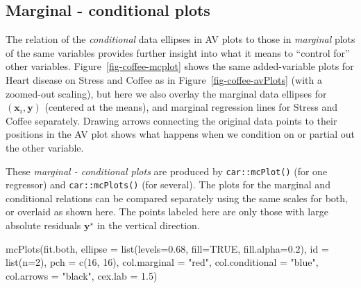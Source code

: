 \documentclass[
  letterpaper,
  10pt,
  krantz2]{krantz}
\makeatletter
\newenvironment{Shaded}{\begin{snugshade}}{\end{snugshade}}
\newcommand{\AttributeTok}[1]{\textcolor[rgb]{0.40,0.45,0.13}{#1}}
\newcommand{\ConstantTok}[1]{\textcolor[rgb]{0.56,0.35,0.01}{#1}}
\newcommand{\DecValTok}[1]{\textcolor[rgb]{0.68,0.00,0.00}{#1}}
\newcommand{\FloatTok}[1]{\textcolor[rgb]{0.68,0.00,0.00}{#1}}
\newcommand{\FunctionTok}[1]{\textcolor[rgb]{0.28,0.35,0.67}{#1}}
\newcommand{\NormalTok}[1]{\textcolor[rgb]{0.00,0.23,0.31}{#1}}
\newcommand{\StringTok}[1]{\textcolor[rgb]{0.13,0.47,0.30}{#1}}
\newenvironment{kframe}{%
  \medskip{}
  \setlength{\fboxsep}{.8em}
  \def\at@end@of@kframe{}%
  \ifinner\ifhmode%
  \def\at@end@of@kframe{\end{minipage}}%
  \begin{minipage}{\columnwidth}%
  \fi\fi%
  \def\FrameCommand##1{\hskip\@totalleftmargin \hskip-\fboxsep
  \colorbox{shadecolor}{##1}\hskip-\fboxsep
      \hskip-\linewidth \hskip-\@totalleftmargin \hskip\columnwidth}%
  \MakeFramed {\advance\hsize-\width
    \@totalleftmargin\z@ \linewidth\hsize
    \@setminipage}}%
{\par\unskip\endMakeFramed%
  \at@end@of@kframe}
\renewenvironment{Shaded}{\begin{kframe}}{\end{kframe}}
\makeatother
\begin{document}
\subsection{Marginal - conditional
plots}\label{marginal---conditional-plots}

The relation of the \emph{conditional} data ellipses in AV plots to
those in \emph{marginal} plots of the same variables provides further
insight into what it means to ``control for'' other variables.
Figure~\ref{fig-coffee-mcplot} shows the same added-variable plots for
Heart disease on Stress and Coffee as in Figure~\ref{fig-coffee-avPlots}
(with a zoomed-out scaling), but here we also overlay the marginal data
ellipses for \((\mathbf{x}_i, \mathbf{y})\) (centered at the means), and
marginal regression lines for Stress and Coffee separately. Drawing
arrows connecting the original data points to their positions in the AV
plot shows what happens when we condition on or partial out the other
variable.

These \emph{marginal - conditional plots} are produced by
\texttt{car::mcPlot()} (for one regressor) and \texttt{car::mcPlots()}
(for several). The plots for the marginal and conditional relations can
be compared separately using the same scales for both, or overlaid as
shown here. The points labeled here are only those with large absolute
residuals \(\mathbf{y}^\star\) in the vertical direction.

\begin{Shaded}
\begin{Highlighting}[]
\FunctionTok{mcPlots}\NormalTok{(fit.both, }
  \AttributeTok{ellipse =} \FunctionTok{list}\NormalTok{(}\AttributeTok{levels=}\FloatTok{0.68}\NormalTok{, }\AttributeTok{fill=}\ConstantTok{TRUE}\NormalTok{, }\AttributeTok{fill.alpha=}\FloatTok{0.2}\NormalTok{),}
  \AttributeTok{id =} \FunctionTok{list}\NormalTok{(}\AttributeTok{n=}\DecValTok{2}\NormalTok{),}
  \AttributeTok{pch =} \FunctionTok{c}\NormalTok{(}\DecValTok{16}\NormalTok{, }\DecValTok{16}\NormalTok{),}
  \AttributeTok{col.marginal =} \StringTok{"red"}\NormalTok{, }\AttributeTok{col.conditional =} \StringTok{"blue"}\NormalTok{,}
  \AttributeTok{col.arrows =} \StringTok{"black"}\NormalTok{,}
  \AttributeTok{cex.lab =} \FloatTok{1.5}\NormalTok{)}
\end{Highlighting}
\end{Shaded}
\end{document}
